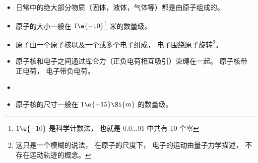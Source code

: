 
\begin{issues}
\issueDraft
\end{issues}

\begin{itemize}
\item 日常中的绝大部分物质（固体，液体，气体等）都是由原子组成的。
\item 原子的大小一般在 $1\e{-10}$\footnote{$1\e{-10}$ 是科学计数法， 也就是 $0.0\dots01$ 中共有 10 个零} 米的数量级。
\item 原子由一个原子核以及一个或多个电子组成， 电子围绕原子旋转\footnote{这只是一个模糊的说法， 在原子的尺度下， 电子的运动由量子力学描述， 不存在运动轨迹的概念。}。
\item 原子核和电子之间通过库仑力（正负电荷相互吸引）束缚在一起。 原子核带正电荷， 电子带负电荷。
\item 

\item 原子核的尺寸一般在 $1\e{-15}\Si{m}$ 的数量级。
\end{itemize}
